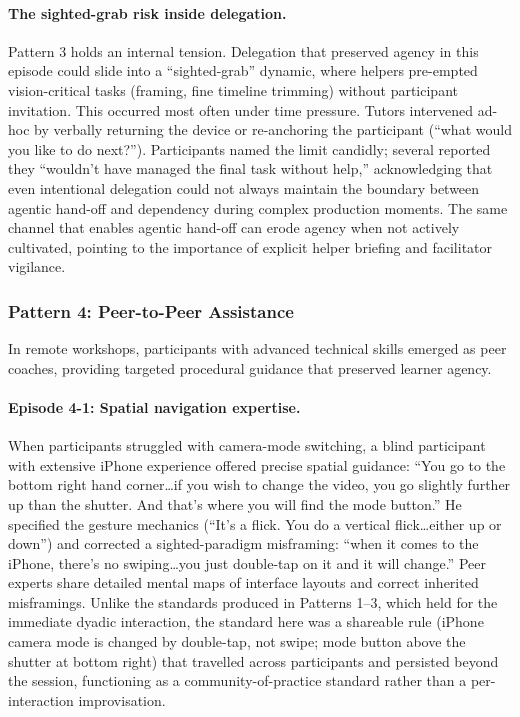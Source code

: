 \paragraph{The sighted-grab risk inside delegation.}
Pattern 3 holds an internal tension. Delegation that preserved agency in this episode could slide into a ``sighted-grab'' dynamic, where helpers pre-empted vision-critical tasks (framing, fine timeline trimming) without participant invitation. This occurred most often under time pressure. Tutors intervened ad-hoc by verbally returning the device or re-anchoring the participant (``what would you like to do next?''). Participants named the limit candidly; several reported they ``wouldn't have managed the final task without help,'' acknowledging that even intentional delegation could not always maintain the boundary between agentic hand-off and dependency during complex production moments. The same channel that enables agentic hand-off can erode agency when not actively cultivated, pointing to the importance of explicit helper briefing and facilitator vigilance.

\subsubsection{Pattern 4: Peer-to-Peer Assistance}

In remote workshops, participants with advanced technical skills emerged as peer coaches, providing targeted procedural guidance that preserved learner agency.

\paragraph{Episode 4-1: Spatial navigation expertise.}
When participants struggled with camera-mode switching, a blind participant with extensive iPhone experience offered precise spatial guidance: ``You go to the bottom right hand corner\ldots if you wish to change the video, you go slightly further up than the shutter. And that's where you will find the mode button.'' He specified the gesture mechanics (``It's a flick. You do a vertical flick\ldots either up or down'') and corrected a sighted-paradigm misframing: ``when it comes to the iPhone, there's no swiping\ldots you just double-tap on it and it will change.'' Peer experts share detailed mental maps of interface layouts and correct inherited misframings. Unlike the standards produced in Patterns 1--3, which held for the immediate dyadic interaction, the standard here was a shareable rule (iPhone camera mode is changed by double-tap, not swipe; mode button above the shutter at bottom right) that travelled across participants and persisted beyond the session, functioning as a community-of-practice standard rather than a per-interaction improvisation.

